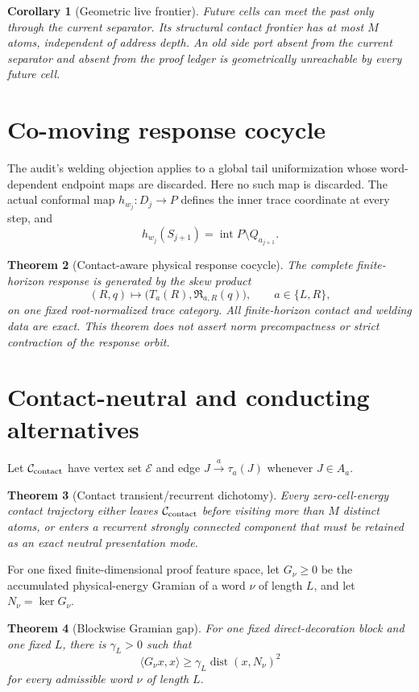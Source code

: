 \documentclass[11pt]{article}
\newtheorem{theorem}{Theorem}[section]
\newtheorem{corollary}[theorem]{Corollary}
\theoremstyle{definition}
\theoremstyle{remark}
\newcommand{\Int}{\operatorname{int}}
\newcommand{\dist}{\operatorname{dist}}
\newcommand{\cE}{\mathcal E}
\newcommand{\cR}{\mathfrak R}
\begin{document}
\begin{corollary}[Geometric live frontier]
Future cells can meet the past only through the current separator.  Its
structural contact frontier has at most $M$ atoms, independent of address
depth.  An old side port absent from the current separator and absent from the
proof ledger is geometrically unreachable by every future cell.
\end{corollary}

\section{Co-moving response cocycle}
The audit's welding objection applies to a global tail uniformization whose
word-dependent endpoint maps are discarded.  Here no such map is discarded.
The actual conformal map $h_{w_j}:D_j\to P$ defines the inner trace coordinate
at every step, and
\[
 h_{w_j}(S_{j+1})=\Int P\setminus Q_{a_{j+1}}.
\]

\begin{theorem}[Contact-aware physical response cocycle]
The complete finite-horizon response is generated by the skew product
\[
 (R,q)\longmapsto
 \bigl(T_a(R),\cR_{a,R}(q)\bigr),
 \qquad a\in\{L,R\},
 \tag{7.1}
\]
on one fixed root-normalized trace category.  All finite-horizon contact and
welding data are exact.  This theorem does not assert norm precompactness or
strict contraction of the response orbit.
\end{theorem}

\section{Contact-neutral and conducting alternatives}
Let $\mathcal C_{\rm contact}$ have vertex set $\cE$ and edge
$J\xrightarrow{a}\tau_a(J)$ whenever $J\in A_a$.

\begin{theorem}[Contact transient/recurrent dichotomy]
Every zero-cell-energy contact trajectory either leaves $\mathcal C_{\rm contact}$ before
visiting more than $M$ distinct atoms, or enters a recurrent strongly
connected component that must be retained as an exact neutral presentation
mode.
\end{theorem}

For one fixed finite-dimensional proof feature space, let $G_\nu\ge0$ be the
accumulated physical-energy Gramian of a word $\nu$ of length $L$, and let
$N_\nu=\ker G_\nu$.

\begin{theorem}[Blockwise Gramian gap]
For one fixed direct-decoration block and one fixed $L$, there is $\gamma_L>0$
such that
\[
 \langle G_\nu x,x\rangle
 \ge \gamma_L\dist(x,N_\nu)^2
 \tag{8.1}
\]
for every admissible word $\nu$ of length $L$.
\end{theorem}
\end{document}
